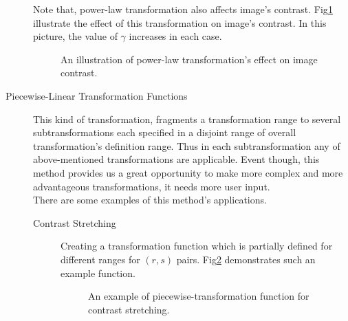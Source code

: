 \documentclass{article}
\begin{document}
\begin{description}
 Note that, power-law transformation also affects image's contrast. Fig\ref{fig:powerLawContrast} illustrate the effect of this transformation on image's contrast. In this picture, the value of $\gamma$ increases in each case.
 
 \begin{figure}[h]
 \center
 \caption{An illustration of power-law transformation's effect on image contrast.}
 \label{fig:powerLawContrast}
 \end{figure}
 
 
 \item [Piecewise-Linear Transformation Functions] This kind of transformation, fragments a transformation range to several subtransformations each specified in a disjoint range of overall transformation's definition range. Thus in each subtransformation any of above-mentioned transformations are applicable. Event though, this method provides us a great opportunity to make more complex and more advantageous transformations, it needs more user input.\\
 There are some examples of this method's applications.
 \begin{description}
 \item [Contrast Stretching] Creating a transformation function which is partially defined for different ranges for $(r,s)$ pairs. Fig\ref{fig:[pieceWiseContrast} demonstrates such an example function.
 \begin{figure}[h]
 \center
 \caption{An example of piecewise-transformation function for contrast stretching.}
 \label{fig:[pieceWiseContrast}
 \end{figure}
 

\end{description}
\end{description}
\end{document}
